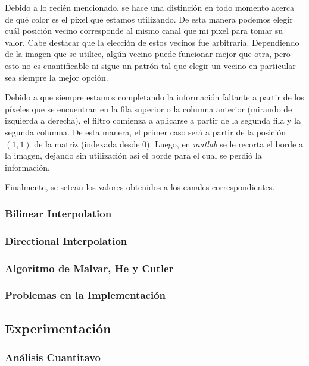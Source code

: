 \par 
Debido a lo recién mencionado, se hace una distinción en todo momento acerca de qué color es el pixel que estamos utilizando. De esta manera podemos elegir cuál posición vecino corresponde al mismo canal que mi pixel para tomar su valor. Cabe destacar que la elección de estos vecinos fue arbitraria. Dependiendo de la imagen que se utilice, algún vecino puede funcionar mejor que otra, pero esto no es cuantificable ni sigue un patrón tal que elegir un vecino en particular sea siempre la mejor opción.
\par 
Debido a que siempre estamos completando la información faltante a partir de los píxeles que se encuentran en la fila superior o la columna anterior (mirando de izquierda a derecha), el filtro comienza a aplicarse a partir de la segunda fila y la segunda columna. De esta manera, el primer caso será a partir de la posición $(1,1)$ de la matriz (indexada desde 0). Luego, en \textit{matlab} se le recorta el borde a la imagen, dejando sin utilización así el borde para el cual se perdió la información.
\par 
Finalmente, se setean los valores obtenidos a los canales correspondientes.



\subsubsection{Bilinear Interpolation}
\subsubsection{Directional Interpolation}
\subsubsection{Algoritmo de Malvar, He y Cutler}


\subsubsection{Problemas en la Implementación}

	
\subsection{Experimentación}


\subsubsection{Análisis Cuantitavo}

